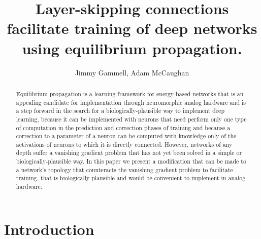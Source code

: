 \documentclass{article}
\title{Layer-skipping connections facilitate training of deep networks using equilibrium propagation.}
\author{Jimmy Gammell, Adam McCaughan}
\begin{document}
\maketitle

\begin{abstract}
Equilibrium propagation is a learning framework for energy-based networks that is an appealing candidate for implementation through neuromorphic analog hardware and is a step forward in the search for a biologically-plausible way to implement deep learning, because it can be implemented with neurons that need perform only one type of computation in the prediction and correction phases of training and because a correction to a parameter of a neuron can be computed with knowledge only of the activations of neurons to which it is directly connected. However, networks of any depth suffer a vanishing gradient problem that has not yet been solved in a simple or biologically-plausible way. In this paper we present a modification that can be made to a network's topology that counteracts the vanishing gradient problem to facilitate training, that is biologically-plausible and would be convenient to implement in analog hardware.
\end{abstract}

\section{Introduction}
\end{document}
